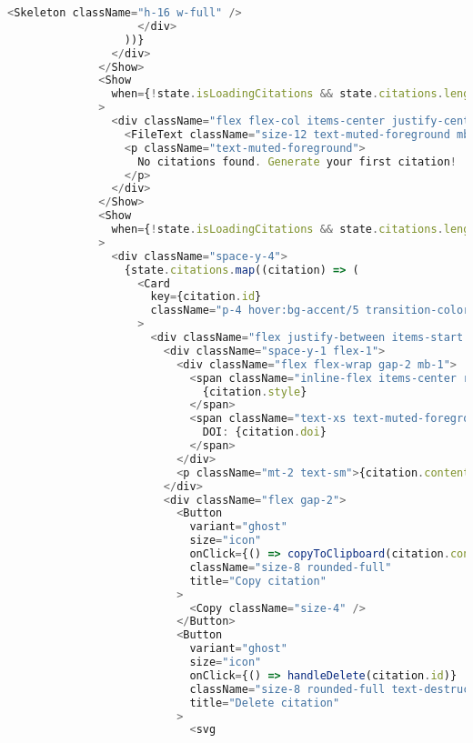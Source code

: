 \begin{lstlisting}[language=TypeScript, caption={Pembuatan Sitasi}, inputencoding=utf8]
                      <Skeleton className="h-16 w-full" />
                    </div>
                  ))}
                </div>
              </Show>
              <Show
                when={!state.isLoadingCitations && state.citations.length === 0}
              >
                <div className="flex flex-col items-center justify-center py-12 text-center">
                  <FileText className="size-12 text-muted-foreground mb-3 opacity-20" />
                  <p className="text-muted-foreground">
                    No citations found. Generate your first citation!
                  </p>
                </div>
              </Show>
              <Show
                when={!state.isLoadingCitations && state.citations.length > 0}
              >
                <div className="space-y-4">
                  {state.citations.map((citation) => (
                    <Card
                      key={citation.id}
                      className="p-4 hover:bg-accent/5 transition-colors"
                    >
                      <div className="flex justify-between items-start gap-4">
                        <div className="space-y-1 flex-1">
                          <div className="flex flex-wrap gap-2 mb-1">
                            <span className="inline-flex items-center rounded-full border px-2.5 py-0.5 text-xs font-semibold">
                              {citation.style}
                            </span>
                            <span className="text-xs text-muted-foreground">
                              DOI: {citation.doi}
                            </span>
                          </div>
                          <p className="mt-2 text-sm">{citation.content}</p>
                        </div>
                        <div className="flex gap-2">
                          <Button
                            variant="ghost"
                            size="icon"
                            onClick={() => copyToClipboard(citation.content)}
                            className="size-8 rounded-full"
                            title="Copy citation"
                          >
                            <Copy className="size-4" />
                          </Button>
                          <Button
                            variant="ghost"
                            size="icon"
                            onClick={() => handleDelete(citation.id)}
                            className="size-8 rounded-full text-destructive hover:text-destructive"
                            title="Delete citation"
                          >
                            <svg

\end{lstlisting}
